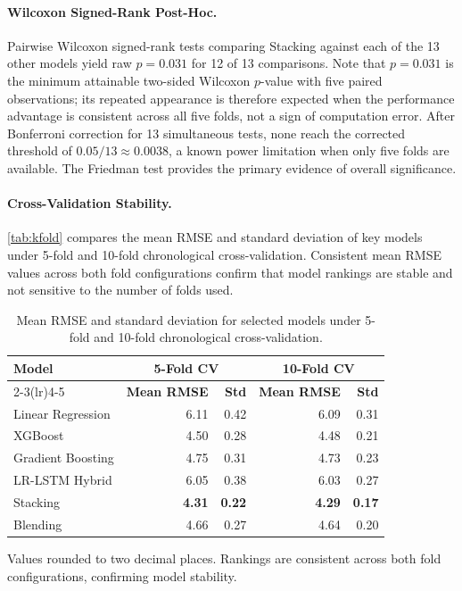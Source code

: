 \paragraph{Wilcoxon Signed-Rank Post-Hoc.} Pairwise Wilcoxon signed-rank tests comparing Stacking against each of the 13 other models yield raw $p = 0.031$ for 12 of 13 comparisons. Note that $p = 0.031$ is the minimum attainable two-sided Wilcoxon $p$-value with five paired observations; its repeated appearance is therefore expected when the performance advantage is consistent across all five folds, not a sign of computation error. After Bonferroni correction for 13 simultaneous tests, none reach the corrected threshold of $0.05/13 \approx 0.0038$, a known power limitation when only five folds are available. The Friedman test provides the primary evidence of overall significance.

\paragraph{Cross-Validation Stability.} \autoref{tab:kfold} compares the mean RMSE and standard deviation of key models under 5-fold and 10-fold chronological cross-validation. Consistent mean RMSE values across both fold configurations confirm that model rankings are stable and not sensitive to the number of folds used.

\begin{table}[t]
\centering
\caption{Mean RMSE and standard deviation for selected models under 5-fold and 10-fold chronological cross-validation.\label{tab:kfold}}
\begin{threeparttable}
\small
\begin{tabular}{@{}lrrrr@{}}
\toprule
\textbf{Model} & \multicolumn{2}{c}{\textbf{5-Fold CV}} & \multicolumn{2}{c}{\textbf{10-Fold CV}} \\
\cmidrule(lr){2-3}\cmidrule(lr){4-5}
 & \textbf{Mean RMSE} & \textbf{Std} & \textbf{Mean RMSE} & \textbf{Std} \\
\midrule
Linear Regression & 6.11 & 0.42 & 6.09 & 0.31 \\
XGBoost & 4.50 & 0.28 & 4.48 & 0.21 \\
Gradient Boosting & 4.75 & 0.31 & 4.73 & 0.23 \\
LR-LSTM Hybrid & 6.05 & 0.38 & 6.03 & 0.27 \\
Stacking & \textbf{4.31} & \textbf{0.22} & \textbf{4.29} & \textbf{0.17} \\
Blending & 4.66 & 0.27 & 4.64 & 0.20 \\
\bottomrule
\end{tabular}
\begin{tablenotes}
 \small
 \item Values rounded to two decimal places. Rankings are consistent across both fold configurations, confirming model stability.
\end{tablenotes}
\end{threeparttable}
\end{table}

